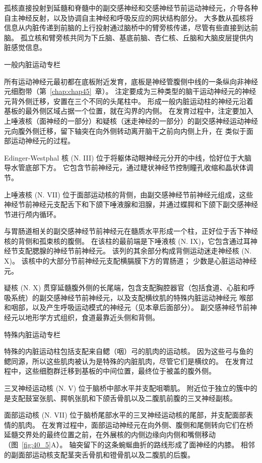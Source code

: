 孤核直接投射到延髓和脊髓中的副交感神经和交感神经节前运动神经元，介导各种自主神经反射，以及协调自主神经和呼吸反应的网状结构部分。
大多数从孤核将信息从内脏传递到前脑的上行投射通过脑桥中的臂旁核传递，尽管有些直接到达前脑。
孤立核和臂旁核共同为下丘脑、基底前脑、杏仁核、丘脑和大脑皮层提供内脏感觉信息。


一般内脏运动专栏

所有运动神经元最初都在底板附近发育，底板是神经管腹侧中线的一条纵向非神经元细胞带（第~\ref{chap:chap45}~章）。
注定要成为三种类型的脑干运动神经元的神经元背外侧迁移，安置在三个不同的头尾柱中。
形成一般内脏运动柱的神经元沿着基板的最外侧区域占据一个位置，就在沟界的内侧。
在发育过程中，注定要加入上唾液核（面神经的一部分）和疑核（迷走神经的一部分）的副交感神经运动神经元向腹外侧迁移，留下轴突在向外侧转动离开脑干之前向内侧上升，在 类似于面部运动神经元的过程。


Edinger-Westphal 核 (N. III) 位于将躯体动眼神经元分开的中线，恰好位于大脑导水管底部下方。
它包含节前神经元，通过睫状神经节控制瞳孔收缩和晶状体调节。


上唾液核 (N. VII) 位于面部运动核的背侧，由副交感神经节前神经元组成，这些神经节前神经元支配舌下和下颌下唾液腺和泪腺，并通过蝶腭和下颌下副交感神经节进行颅内循环。


与胃肠道相关的副交感神经节前神经元在髓质水平形成一个柱，正好位于舌下神经核的背侧和孤束核的腹侧。
在该柱的最前端是下唾液核 (N. IX)，它包含通过耳神经节支配腮腺的神经节前神经元。
该列的其余部分构成背侧运动迷走神经核 (N. X)。
该核中的大部分节前神经元支配横膈膜下方的胃肠道；
少数是心脏运动神经元。


疑核 (N. X) 贯穿延髓腹外侧的长尾端，包含支配胸腔器官（包括食道、心脏和呼吸系统）的副交感神经节前神经元，以及支配横纹肌的特殊内脏运动神经元 喉部和咽部，以及产生呼吸运动模式的神经元（见本章后面部分）。
副交感神经节前神经元以地形学方式组织，食道最靠近头侧和背侧。


特殊内脏运动专栏

特殊的内脏运动柱包括支配来自鳃（咽）弓的肌肉的运动核。
因为这些弓与鱼的鳃同源，所以这些肌肉被认为是特殊的内脏肌肉，尽管它们是横纹的。
在发育过程中，这些细胞群迁移到基板的中间位置，最终位于被盖的腹外侧。


三叉神经运动核 (N. V) 位于脑桥中部水平并支配咀嚼肌。
附近位于独立的簇中的是支配鼓室张肌、腭帆张肌和下颌舌骨肌以及二腹肌前腹的三叉神经副核。


面部运动核 (N. VII) 位于脑桥尾部水平的三叉神经运动核的尾部，并支配面部表情的肌肉。
在发育过程中，面部运动神经元在向外侧、腹侧和尾侧转向它们在桥延髓交界处的最终位置之前，在外展核的内侧边缘向内侧和嘴侧移动（图~\ref{fig:40_5}A）。
轴突留下的这条蜿蜒曲折的路线形成了面神经的内膝。
相邻的副面部运动核支配茎突舌骨肌和镫骨肌以及二腹肌的后腹。


